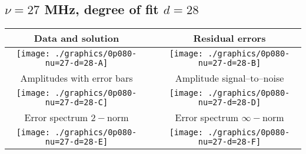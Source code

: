

% 

\clearpage{}
\break{}

\subsection{$\nu = 27$ MHz, degree of fit $d = 28$}

\begin{table}[h]
    \begin{center}
        \begin{tabular}{ccc}
            Data and solution & \quad & Residual errors \\\hline
            \texttt{[image: ./graphics/0p080-nu=27-d=28-A]} &&
            \texttt{[image: ./graphics/0p080-nu=27-d=28-B]} \\[15pt]
            Amplitudes with error bars && Amplitude signal--to--noise \\\hline
            \texttt{[image: ./graphics/0p080-nu=27-d=28-C]} &&
            \texttt{[image: ./graphics/0p080-nu=27-d=28-D]} \\[15pt]
            Error spectrum $2-$norm && Error spectrum $\infty-$norm \\\hline
            \texttt{[image: ./graphics/0p080-nu=27-d=28-E]} &&
            \texttt{[image: ./graphics/0p080-nu=27-d=28-F]} \\[15pt]
        \end{tabular}
    \end{center}
\label{fig:elev=80, nu=27}
\end{table}



\endinput
